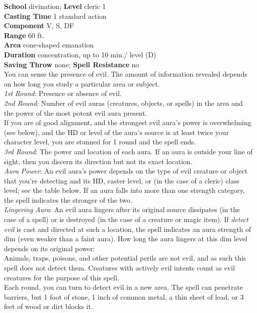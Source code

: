 \textbf{School} divination; \textbf{Level} cleric 1\\
\textbf{Casting Time }1 standard action\\
\textbf{Component} V, S, DF\\
\textbf{Range} 60 ft.\\
\textbf{Area} cone-shaped emanation\\
\textbf{Duration} concentration, up to 10 min./ level (D)\\
\textbf{Saving Throw} none; \textbf{Spell Resistance} no\\
You can sense the presence of evil. The amount of information revealed depends on how long you study a particular area or subject.\\
\textit{1st Round}: Presence or absence of evil.\\
\textit{2nd Round}: Number of evil auras (creatures, objects, or spells) in the area and the power of the most potent evil aura present.\\
If you are of good alignment, and the strongest evil aura's power is overwhelming (see below), and the HD or level of the aura's source is at least twice your character level, you are stunned for 1 round and the spell ends.\\
\textit{3rd Round}: The power and location of each aura. If an aura is outside your line of sight, then you discern its direction but not its exact location.\\
\textit{Aura Power}: An evil aura's power depends on the type of evil creature or object that you're detecting and its HD, caster level, or (in the case of a cleric) class level; see the table below. If an aura falls into more than one strength category, the spell indicates the stronger of the two.\\
\textit{Lingering Aura}: An evil aura lingers after its original source dissipates (in the case of a spell) or is destroyed (in the case of a creature or magic item). If \textit{detect evil }is cast and directed at such a location, the spell indicates an aura strength of dim (even weaker than a faint aura). How long the aura lingers at this dim level depends on its original power:\\
Animals, traps, poisons, and other potential perils are not evil, and as such this spell does not detect them. Creatures with actively evil intents count as evil creatures for the purpose of this spell.\\
Each round, you can turn to detect evil in a new area. The spell can penetrate barriers, but 1 foot of stone, 1 inch of common metal, a thin sheet of lead, or 3 feet of wood or dirt blocks it.\\
